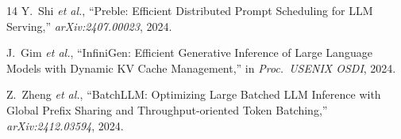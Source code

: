 \documentclass[journal]{IEEEtran}
\begin{document}
\begin{thebibliography}{14}
Y.~Shi \emph{et al.},
``Preble: Efficient Distributed Prompt Scheduling for LLM Serving,''
\emph{arXiv:2407.00023}, 2024.

J.~Gim \emph{et al.},
``InfiniGen: Efficient Generative Inference of Large Language Models with
Dynamic KV Cache Management,''
in \emph{Proc.\ USENIX OSDI}, 2024.

Z.~Zheng \emph{et al.},
``BatchLLM: Optimizing Large Batched LLM Inference with Global Prefix Sharing
and Throughput-oriented Token Batching,''
\emph{arXiv:2412.03594}, 2024.

\end{thebibliography}

\balance
\end{document}
